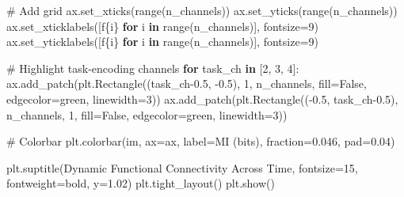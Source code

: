 \documentclass[
  11pt,
  letterpaper,
  oneside,
  openany]{book}
\newenvironment{Shaded}{\begin{snugshade}}{\end{snugshade}}
\newcommand{\BuiltInTok}[1]{\textcolor[rgb]{0.00,0.23,0.31}{#1}}
\newcommand{\CommentTok}[1]{\textcolor[rgb]{0.37,0.37,0.37}{#1}}
\newcommand{\ControlFlowTok}[1]{\textcolor[rgb]{0.00,0.23,0.31}{\textbf{#1}}}
\newcommand{\DecValTok}[1]{\textcolor[rgb]{0.68,0.00,0.00}{#1}}
\newcommand{\FloatTok}[1]{\textcolor[rgb]{0.68,0.00,0.00}{#1}}
\newcommand{\KeywordTok}[1]{\textcolor[rgb]{0.00,0.23,0.31}{\textbf{#1}}}
\newcommand{\NormalTok}[1]{\textcolor[rgb]{0.00,0.23,0.31}{#1}}
\newcommand{\OperatorTok}[1]{\textcolor[rgb]{0.37,0.37,0.37}{#1}}
\newcommand{\SpecialCharTok}[1]{\textcolor[rgb]{0.37,0.37,0.37}{#1}}
\newcommand{\SpecialStringTok}[1]{\textcolor[rgb]{0.13,0.47,0.30}{#1}}
\newcommand{\StringTok}[1]{\textcolor[rgb]{0.13,0.47,0.30}{#1}}
\newcommand{\VariableTok}[1]{\textcolor[rgb]{0.07,0.07,0.07}{#1}}
\begin{document}
\begin{Shaded}
\begin{Highlighting}[]
    \CommentTok{\# Add grid}
\NormalTok{    ax.set\_xticks(}\BuiltInTok{range}\NormalTok{(n\_channels))}
\NormalTok{    ax.set\_yticks(}\BuiltInTok{range}\NormalTok{(n\_channels))}
\NormalTok{    ax.set\_xticklabels([}\SpecialStringTok{f\textquotesingle{}}\SpecialCharTok{\{}\NormalTok{i}\SpecialCharTok{\}}\SpecialStringTok{\textquotesingle{}} \ControlFlowTok{for}\NormalTok{ i }\KeywordTok{in} \BuiltInTok{range}\NormalTok{(n\_channels)], fontsize}\OperatorTok{=}\DecValTok{9}\NormalTok{)}
\NormalTok{    ax.set\_yticklabels([}\SpecialStringTok{f\textquotesingle{}}\SpecialCharTok{\{}\NormalTok{i}\SpecialCharTok{\}}\SpecialStringTok{\textquotesingle{}} \ControlFlowTok{for}\NormalTok{ i }\KeywordTok{in} \BuiltInTok{range}\NormalTok{(n\_channels)], fontsize}\OperatorTok{=}\DecValTok{9}\NormalTok{)}
    
    \CommentTok{\# Highlight task{-}encoding channels}
    \ControlFlowTok{for}\NormalTok{ task\_ch }\KeywordTok{in}\NormalTok{ [}\DecValTok{2}\NormalTok{, }\DecValTok{3}\NormalTok{, }\DecValTok{4}\NormalTok{]:}
\NormalTok{        ax.add\_patch(plt.Rectangle((task\_ch}\OperatorTok{{-}}\FloatTok{0.5}\NormalTok{, }\OperatorTok{{-}}\FloatTok{0.5}\NormalTok{), }\DecValTok{1}\NormalTok{, n\_channels,}
\NormalTok{                                  fill}\OperatorTok{=}\VariableTok{False}\NormalTok{, edgecolor}\OperatorTok{=}\StringTok{\textquotesingle{}green\textquotesingle{}}\NormalTok{, linewidth}\OperatorTok{=}\DecValTok{3}\NormalTok{))}
\NormalTok{        ax.add\_patch(plt.Rectangle((}\OperatorTok{{-}}\FloatTok{0.5}\NormalTok{, task\_ch}\OperatorTok{{-}}\FloatTok{0.5}\NormalTok{), n\_channels, }\DecValTok{1}\NormalTok{,}
\NormalTok{                                  fill}\OperatorTok{=}\VariableTok{False}\NormalTok{, edgecolor}\OperatorTok{=}\StringTok{\textquotesingle{}green\textquotesingle{}}\NormalTok{, linewidth}\OperatorTok{=}\DecValTok{3}\NormalTok{))}
    
    \CommentTok{\# Colorbar}
\NormalTok{    plt.colorbar(im, ax}\OperatorTok{=}\NormalTok{ax, label}\OperatorTok{=}\StringTok{\textquotesingle{}MI (bits)\textquotesingle{}}\NormalTok{, fraction}\OperatorTok{=}\FloatTok{0.046}\NormalTok{, pad}\OperatorTok{=}\FloatTok{0.04}\NormalTok{)}

\NormalTok{plt.suptitle(}\StringTok{\textquotesingle{}Dynamic Functional Connectivity Across Time\textquotesingle{}}\NormalTok{, }
\NormalTok{             fontsize}\OperatorTok{=}\DecValTok{15}\NormalTok{, fontweight}\OperatorTok{=}\StringTok{\textquotesingle{}bold\textquotesingle{}}\NormalTok{, y}\OperatorTok{=}\FloatTok{1.02}\NormalTok{)}
\NormalTok{plt.tight\_layout()}
\NormalTok{plt.show()}


\end{Highlighting}
\end{Shaded}
\end{document}
